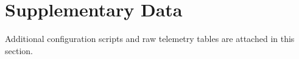 \chapter{Supplementary Data}
\label{ch:appendix_a}

Additional configuration scripts and raw telemetry tables are attached in this section.